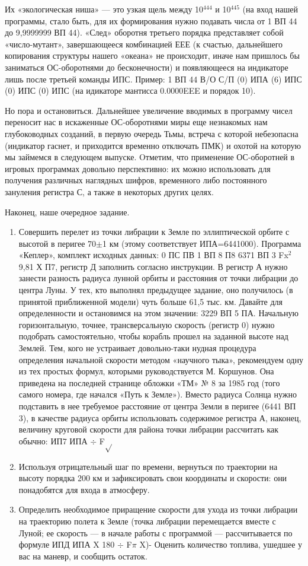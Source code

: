 \documentclass[11pt,a4paper,oneside]{article}
\begin{document}
Их «экологическая ниша» — это узкая щель между 10$^{444}$ и 10$^{445}$ (на вход нашей программы, стало быть, для их формирования нужно подавать числа от 1 ВП 44 до 9,9999999 ВП 44). «След» оборотня третьего порядка представляет собой «число-мутант», завершающееся комбинацией ЕЕЕ (к счастью, дальнейшего копирования структуры нашего «океана» не происходит, иначе нам пришлось бы заниматься ОС-оборотнями до бесконечности) и появляющееся на индикаторе лишь после третьей команды ИПС. Пример: 1 ВП 44 В/О С/П (0) ИПА (6) ИПС (0) ИПС (0) ИПС (на идикаторе мантисса 0.0000EEE и порядок 10).

Но пора и остановиться. Дальнейшее увеличение вводимых в программу чисел переносит нас в искаженные ОС-оборотнями миры еще незнакомых нам глубоководных созданий, в первую очередь Тьмы, встреча с которой небезопасна (индикатор гаснет, и приходится временно отключать ПМК) и охотой на которую мы займемся в следующем выпуске. Oтметим, что применение ОС-оборотней в игровых программах довольно перспективно: их можно использовать для получения различных наглядных шифров, временного либо постоянного зануления регистра С, а также в некоторых других целях.

Наконец, наше очередное задание.
\begin{enumerate}
\item Совершить перелет из точки либрации к Земле по эллиптической орбите с высотой в перигее 70$\pm$1 км (этому соответствует ИПА=6441000). Программа «Кеплер», комплект исходных данных: 0 ПС ПВ 1 ВП 8 П8 6371 ВП 3 Fx$^{2}$ 9,81 Х П7, регистр Д заполнить согласно инструкции. В регистр А нужно занести разность радиуса лунной орбиты и расстояния от точки либрации до центра Луны. У тех, кто выполнял предыдущее задание, оно получилось (в принятой приближенной модели) чуть больше 61,5 тыс. км. Давайте для определенности и остановимся на этом значении: 3229 ВП 5 ПА. Начальную горизонтальную, точнее, трансверсальную скорость (регистр 0) нужно подобрать самостоятельно, чтобы корабль прошел на заданной высоте над Землей. Тем, кого не устраивает довольно-таки нудная процедура определения начальной скорости методом «научного тыка», рекомендуем одну из тех простых формул, которыми руководствуется М. Коршунов. Она приведена на последней странице обложки «ТМ» № 8 за 1985 год (того самого номера, где начался «Путь к Земле»). Вместо радиуса Солнца нужно подставить в нее требуемое расстояние от центра Земли в перигее (6441 ВП 3), в качестве радиуса орбиты использовать содержимое регистра А, наконец, величину круговой скорости для района точки либрации рассчитать как обычно: ИП7 ИПА $\div$ F$\sqrt{}$
\item Используя отрицательный шаг по времени, вернуться по траектории на высоту порядка 200 км и зафиксировать свои координаты и скорости: они понадобятся для входа в атмосферу.
\item Определить необходимое приращение скорости для ухода из точки либрации на траекторию полета к Земле (точка либрации перемещается вместе с Луной; ее скорость — в начале работы с программой — рассчитывается по формуле ИПД ИПА X 180 $\div$ F$\pi$ X)- Оценить количество топлива, ушедшее у вас на маневр, и сообщить остаток.
\end{enumerate}
\end{document}
